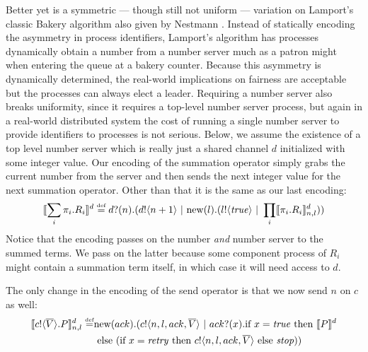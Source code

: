 Better yet is a symmetric --- though still not uniform --- variation on Lamport's classic Bakery algorithm \cite{lamp74} also given by Nestmann \cite{nestm00}.
Instead of statically encoding the asymmetry in process identifiers, Lamport's algorithm has processes dynamically obtain a number from a number server much as a patron might when entering the queue at a bakery counter.
Because this asymmetry is dynamically determined, the real-world implications on fairness are acceptable but the processes can always elect a leader.
Requiring a number server also breaks uniformity, since it requires a top-level number server process, but again in a real-world distributed system the cost of running a single number server to provide identifiers to processes is not serious.  
Below, we assume the existence of a top level number server which is really just a shared channel $d$ initialized with some integer value.  
Our encoding of the summation operator simply grabs the current number from the server and then sends the next integer value for the next summation operator.  
Other than that it is the same as our last encoding:
\[
	\llbracket{\displaystyle\sum_{i} \pi_i.R_i}\rrbracket^d \overset{\mbox{\tiny{def}}}{=} {d}?({n}).({d}!\langle{n+1}\rangle \ |\  \text{new}({l}).({l}!\langle{ \ensuremath{\text{\emph{true}}} }\rangle \ |\  \displaystyle\prod_{i}\llbracket{\pi_i.R_i}\rrbracket^d_{n,l}))
\]
Notice that the encoding passes on the number \emph{and} number server to the summed terms.  
We pass on the latter because some component process of $R_i$ might contain a summation term itself, in which case it will need access to $d$.

The only change in the encoding of the send operator is that we now send $n$ on $c$ as well:
\begin{equation*}\begin{split}
	\llbracket{ \ensuremath{{c}!\langle{ \ensuremath{\overline{V}} }\rangle.} P}\rrbracket^d_{n,l} \overset{\mbox{\tiny{def}}}{=} & \text{new}({ack}).({c}!\langle{n,l,ack, \ensuremath{\overline{V}} }\rangle \ |\  {ack}?({x}). \text{if } {x= \ensuremath{\text{\emph{true}}} } \text{ then } \llbracket{P}\rrbracket^d \\
	&\text{ else } (\text{if } {x= \ensuremath{\text{\emph{retry}}} } \text{ then } {c}!\langle{n,l,ack, \ensuremath{\overline{V}} }\rangle \text{ else } \mbox{\emph{stop}}))
\end{split}\end{equation*}

